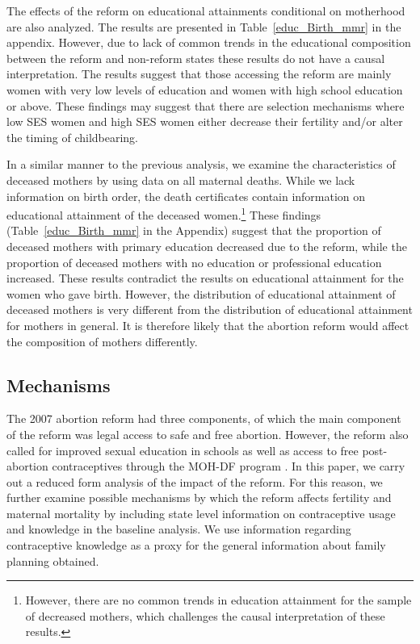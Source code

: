 \documentclass[a4paper, 11pt]{article}
\begin{document}
\begin{spacing}{2}
 

 The effects of the reform on educational attainments conditional on motherhood are also analyzed. The results are presented in Table~\ref{educ_Birth_mmr} in the appendix. However, due to lack of common trends in the educational composition between the reform and non-reform states these results do not have a causal interpretation. The results suggest that those accessing the reform are mainly women with very low levels of education and women with high school education or above. These findings may suggest that there are selection mechanisms where low SES women and high SES women either decrease their fertility and/or alter the timing of childbearing. 
 
 In a similar manner to the previous analysis, we examine the characteristics of deceased mothers by using data on all maternal deaths. While we lack information on birth order, the death certificates contain information on educational attainment of the deceased women.\footnote{However, there are no common trends in education attainment for the sample of decreased mothers, which challenges the causal interpretation of these results.} These findings (Table~\ref{educ_Birth_mmr} in the Appendix) suggest that the proportion of deceased mothers with primary education decreased due to the reform, while the proportion of deceased mothers with no education or professional education increased. These results contradict the results on educational attainment for the women who gave birth. However, the distribution of educational attainment of deceased mothers is very different from the distribution of educational attainment for mothers in general. It is therefore likely that the abortion reform would affect the composition of mothers differently. 

 
\subsection{Mechanisms}\label{Mechanisms}

The 2007 abortion reform had three components, of which the main component of the reform was legal access to safe and free abortion. However, the reform also called for improved sexual education in schools as well as access to free post-abortion contraceptives through the MOH-DF program \citep{Becker}. In this paper, we carry out a reduced form analysis of the impact of the reform. For this reason, we further examine possible mechanisms by which the reform affects fertility and maternal mortality by including state level information on contraceptive usage and knowledge in the baseline analysis. We use information regarding contraceptive knowledge as a proxy for the general information about family planning obtained.



\end{spacing}
\end{document}
